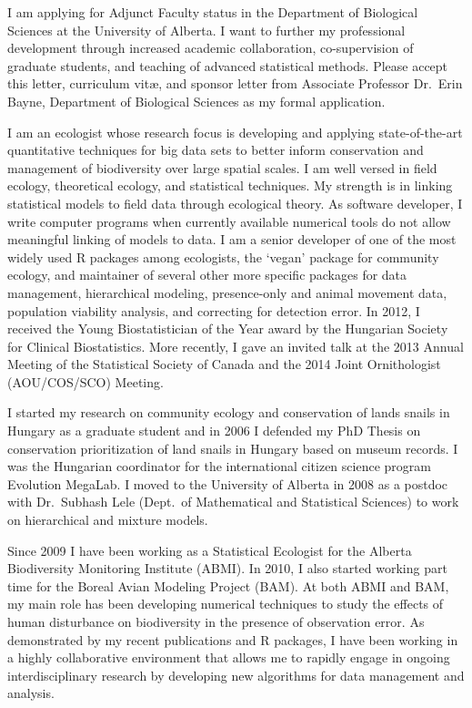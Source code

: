 \documentclass[11pt,letterpaper,roman]{moderncv}
\begin{document}
\makelettertitle

I am applying for Adjunct Faculty status in the Department of Biological Sciences at the University of Alberta. I want to further my professional development through increased academic collaboration, co-supervision of graduate students, and teaching of advanced statistical methods. Please accept this letter, curriculum vit\ae{}, and sponsor letter from Associate Professor Dr.~Erin Bayne, Department of Biological Sciences as my formal application.
\vspace{0.1pc}

I am an ecologist whose research focus is developing and applying state-of-the-art quantitative techniques for big data sets to better inform conservation and management of biodiversity over large spatial scales. I am well versed in field ecology, theoretical ecology, and statistical techniques. My strength is in linking statistical models to field data through ecological theory. As software developer, I write computer programs when currently available numerical tools do not allow meaningful linking of models to data. I am a senior developer of one of the most widely used R packages among ecologists, the `vegan' package for community ecology, and maintainer of several other more specific packages for data management, hierarchical modeling, presence-only and animal movement data, population viability analysis, and correcting for detection error. In 2012, I received the Young Biostatistician of the Year award by the Hungarian Society for Clinical Biostatistics.  More recently, I gave an invited talk at the 2013 Annual Meeting of the Statistical Society of Canada and the 2014 Joint Ornithologist (AOU/COS/SCO) Meeting.
\vspace{0.1pc}

I started my research on community ecology and conservation of lands snails in Hungary as a graduate student and in 2006 I defended my PhD Thesis on conservation prioritization of land snails in Hungary based on museum records. I was the Hungarian coordinator for the international citizen science program Evolution MegaLab. I moved to the University of Alberta in 2008 as a postdoc with Dr.~Subhash Lele (Dept.~of Mathematical and Statistical Sciences) to work on hierarchical and mixture models. 
\vspace{0.1pc}

Since 2009 I have been working as a Statistical Ecologist for the Alberta Biodiversity Monitoring Institute (ABMI). In 2010, I also started working part time for the Boreal Avian Modeling Project (BAM). At both ABMI and BAM, my main role has been developing numerical techniques to study the effects of human disturbance on biodiversity in the presence of observation error. As demonstrated by my recent publications and R packages, I have been working in a highly collaborative environment that allows me to rapidly engage in ongoing interdisciplinary research by developing new algorithms for data management and analysis.
\vspace{0.1pc}
\end{document}
